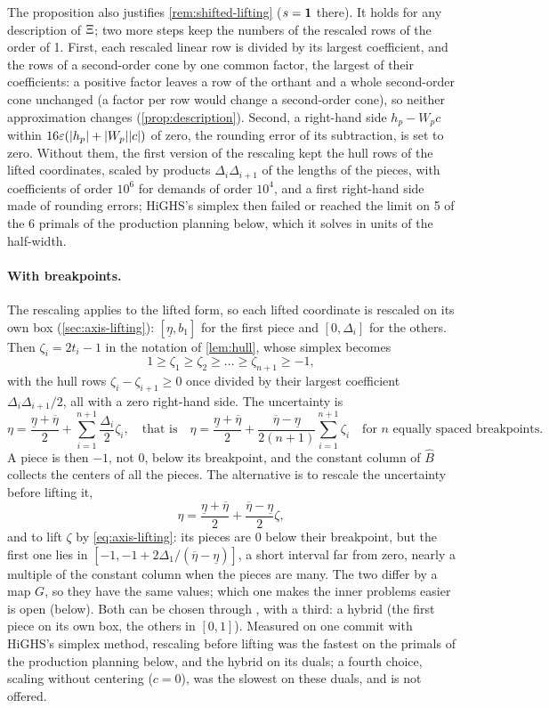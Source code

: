 The proposition also justifies \cref{rem:shifted-lifting} ($s = \mathbf{1}$ there).
It holds for any description of $\Xi$; two more steps keep the numbers of the rescaled rows of the order of 1.
First, each rescaled linear row is divided by its largest coefficient, and the rows of a second-order cone by one common factor, the largest of their coefficients:
a positive factor leaves a row of the orthant and a whole second-order cone unchanged (a factor per row would change a second-order cone), so neither approximation changes (\cref{prop:description}).
Second, a right-hand side $h_p - W_pc$ within $16\varepsilon(\lvert h_p \rvert + \lvert W_p \rvert\lvert c \rvert)$ of zero, the rounding error of its subtraction, is set to zero.
Without them, the first version of the rescaling kept the hull rows of the lifted coordinates, scaled by products $\Delta_i\Delta_{i+1}$ of the lengths of the pieces, with coefficients of order $10^6$ for demands of order $10^4$, and a first right-hand side made of rounding errors;
HiGHS's simplex then failed or reached the limit on 5 of the 6 primals of the production planning below, which it solves in units of the half-width.

\paragraph{With breakpoints.}
The rescaling applies to the lifted form, so each lifted coordinate is rescaled on its own box (\cref{sec:axis-lifting}):
$[\underline\eta, b_1]$ for the first piece and $[0, \Delta_i]$ for the others.
Then $\zeta_i = 2t_i - 1$ in the notation of \cref{lem:hull}, whose simplex becomes
\[
1 \ge \zeta_1 \ge \zeta_2 \ge \dots \ge \zeta_{n+1} \ge -1,
\]
with the hull rows $\zeta_i - \zeta_{i+1} \ge 0$ once divided by their largest coefficient $\Delta_i\Delta_{i+1}/2$, all with a zero right-hand side.
The uncertainty is
\[
\eta = \frac{\underline\eta + \overline\eta}{2} + \sum_{i=1}^{n+1} \frac{\Delta_i}{2}\zeta_i,
\quad\text{that is}\quad
\eta = \frac{\underline\eta + \overline\eta}{2} + \frac{\overline\eta - \underline\eta}{2(n+1)}\sum_{i=1}^{n+1} \zeta_i
\quad\text{for $n$ equally spaced breakpoints.}
\]
A piece is then $-1$, not $0$, below its breakpoint, and the constant column of $\hat B$ collects the centers of all the pieces.
The alternative is to rescale the uncertainty before lifting it,
\[
\eta = \frac{\underline\eta + \overline\eta}{2} + \frac{\overline\eta - \underline\eta}{2}\zeta,
\]
and to lift $\zeta$ by \eqref{eq:axis-lifting}:
its pieces are $0$ below their breakpoint, but the first one lies in $[-1, -1 + 2\Delta_1/(\overline\eta - \underline\eta)]$,
a short interval far from zero, nearly a multiple of the constant column when the pieces are many.
The two differ by a map $G$, so they have the same values;
which one makes the inner problems easier is open (below).
Both can be chosen through , with a third: a hybrid (the first piece on its own box, the others in $[0, 1]$).
Measured on one commit with HiGHS's simplex method, rescaling before lifting was the fastest on the primals of the production planning below, and the hybrid on its duals;
a fourth choice, scaling without centering ($c = 0$), was the slowest on these duals, and is not offered.

